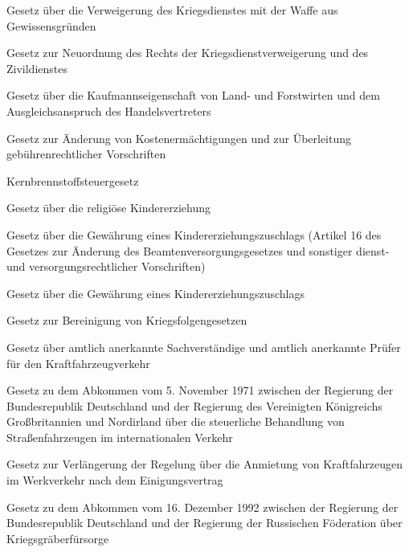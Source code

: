 \item[{KDVG-2003}] Gesetz über die Verweigerung des Kriegsdienstes mit der Waffe aus Gewissensgründen

\item[{KDVNG}] Gesetz zur Neuordnung des Rechts der Kriegsdienstverweigerung und des Zivildienstes

\item[{KELG}] Gesetz über die Kaufmannseigenschaft von Land- und Forstwirten und dem Ausgleichsanspruch des Handelsvertreters

\item[{KErmÄndG}] Gesetz zur Änderung von Kostenermächtigungen und zur Überleitung gebührenrechtlicher Vorschriften

\item[{KernbrStG}] Kernbrennstoffsteuergesetz

\item[{KErzG}] Gesetz über die religiöse Kindererziehung

\item[{KEZG}] Gesetz über die Gewährung eines Kindererziehungszuschlags (Artikel 16 des Gesetzes zur Änderung des Beamtenversorgungsgesetzes und sonstiger dienst- und versorgungsrechtlicher Vorschriften)

\item[{KEZG-1998}] Gesetz über die Gewährung eines Kindererziehungszuschlags

\item[{KfbG}] Gesetz zur Bereinigung von Kriegsfolgengesetzen

\item[{KfSachvG}] Gesetz über amtlich anerkannte Sachverständige und amtlich anerkannte Prüfer für den Kraftfahrzeugverkehr

\item[{KfzAbkGBRG}] Gesetz zu dem Abkommen vom 5. November 1971 zwischen der Regierung der Bundesrepublik Deutschland und der Regierung des Vereinigten Königreichs Großbritannien und Nordirland über die steuerliche Behandlung von Straßenfahrzeugen im internationalen Verkehr

\item[{KfzAnmVerlG}] Gesetz zur Verlängerung der Regelung über die Anmietung von Kraftfahrzeugen im Werkverkehr nach dem Einigungsvertrag

\item[{KGFAbkG}] Gesetz zu dem Abkommen vom 16. Dezember 1992 zwischen der Regierung der Bundesrepublik Deutschland und der Regierung der Russischen Föderation über Kriegsgräberfürsorge

